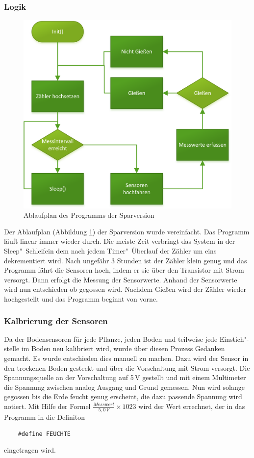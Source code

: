 	\subsubsection{Logik}
		\begin{figure}[!h]
	\centering
	\includegraphics[width=0.8\linewidth]{Diagramme/SV_Ablaufdiagramm.png}
	\caption{Ablaufplan des Programms der Sparversion}
	\label{fig-SV_Ablaufplan}
\end{figure}

	Der Ablaufplan (Abbildung \ref{fig-SV_Ablaufplan}) der Sparversion wurde vereinfacht. Das Programm läuft linear immer wieder durch.
	Die meiste Zeit verbringt das System in der \glqq Sleep"~Schleife\grqq in dem nach jedem Timer"~Überlauf der Zähler um eins dekrementiert wird.
	Nach ungefähr 3 Stunden ist der Zähler klein genug und das Programm fährt die Sensoren hoch, indem er sie über den Transistor mit Strom versorgt.
	Dann erfolgt die Messung der Sensorwerte.
	Anhand der Sensorwerte wird nun entschieden ob gegossen wird.
	Nachdem Gießen wird der Zähler wieder hochgestellt und das Programm beginnt von vorne.
	\subsubsection{Kalbrierung der Sensoren}
	Da der Bodensensoren für jede Pflanze, jeden Boden und teilweise jede Einstich"-stelle im Boden neu kalibriert wird, wurde über diesen Prozess Gedanken gemacht.
	Es wurde entschieden dies manuell zu machen. 
	Dazu wird der Sensor in den trockenen Boden gesteckt und über die Vorschaltung mit Strom versorgt.
	Die Spannungsquelle an der Vorschaltung auf 5\,V gestellt und mit einem Multimeter die Spannung zwischen analog Ausgang und Grund gemessen.
	Nun wird solange gegossen bis die Erde feucht genug erscheint, die dazu passende Spannung wird notiert.
	Mit Hilfe der Formel \begin{math} { \frac{Messwert}{5,0\,V} } \times 1023 \end{math} wird der Wert errechnet, der in das Programm in die Definiton 
	\begin{verbatim}
	#define FEUCHTE	
	\end{verbatim} 
	eingetragen wird.
	
